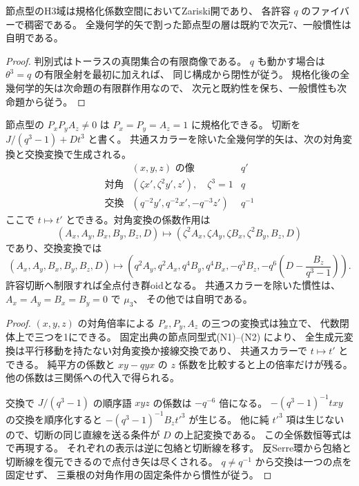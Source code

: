 \begin{corollary}\label{cor:cubic-CY-three-alpha-nodal-E6-open}
節点型のH3域は規格化係数空間においてZariski開であり、
各許容 $q$ のファイバーで稠密である。
全幾何学的矢で割った節点型の層は既約で次元7、一般慣性は自明である。
\end{corollary}
\begin{proof}
判別式はトーラスの真閉集合の有限商像である。
$q$ も動かす場合は $\theta^3=q$ の有限全射を最初に加えれば、
同じ構成から閉性が従う。
規格化後の全幾何学的矢は次命題の有限群作用なので、
次元と既約性を保ち、一般慣性も次命題から従う。
\end{proof}

\begin{proposition}\label{prop:cubic-CY-three-alpha-nodal-arrows}
節点型の $P_xP_yA_z\ne0$ は $P_x=P_y=A_z=1$ に規格化できる。
切断を $J/(q^3-1)+Dt^3$ と書く。
共通スカラーを除いた全幾何学的矢は、次の対角変換と交換変換で生成される。
\[
\begin{array}{c|c|c}
 & (x,y,z)\text{ の像} & q'\\ \hline
 \text{対角} & (\zeta x',\zeta^2y',z'),\quad \zeta^3=1 & q\\
 \text{交換} & (q^{-2}y',q^{-2}x',-q^{-3}z') & q^{-1}
\end{array}
\]
ここで $t\mapsto t'$ とできる。対角変換の係数作用は
\[
 (A_x,A_y,B_x,B_y,B_z,D)
 \longmapsto(\zeta^2 A_x,\zeta A_y,\zeta B_x,\zeta^2 B_y,B_z,D)
\]
であり、交換変換では
\[
 (A_x,A_y,B_x,B_y,B_z,D)
 \longmapsto
 \left(q^2 A_y,q^2 A_x,q^4 B_y,q^4 B_x,-q^3 B_z,
       -q^6\left(D-\frac{B_z}{q^3-1}\right)\right).
\]
許容切断へ制限すれば全点付き群oidとなる。
共通スカラーを除いた慣性は、$A_x=A_y=B_x=B_y=0$ で $\mu_3$、
その他では自明である。
\end{proposition}
\begin{proof}
$(x,y,z)$ の対角倍率による $P_x,P_y,A_z$ の三つの変換式は独立で、
代数閉体上で三つを1にできる。
固定出典の節点同型式(N1)--(N2) \cite{AS4CYpinned}により、
全生成元変換は平行移動を持たない対角変換か接線交換であり、
共通スカラーで $t\mapsto t'$ とできる。
純平方の係数と $xy-qyx$ の $z$ 係数を比較すると上の倍率だけが残る。
他の係数は三関係への代入で得られる。

交換で $J/(q^3-1)$ の順序語 $xyz$ の係数は $-q^{-6}$ 倍になる。
$-(q^3-1)^{-1}txy$ の交換を順序化すると
$-(q^3-1)^{-1}B_z t'^3$ が生じる。
他に純 $t'^3$ 項は生じないので、切断の同じ直線を送る条件が
$D$ の上記変換である。
この全係数恒等式は  で再現する。
それぞれの表示は逆に包絡と切断線を移す。
反Serre環から包絡と切断線を復元できるので点付き矢は尽くされる。
$q\ne q^{-1}$ から交換は一つの点を固定せず、
三乗根の対角作用の固定条件から慣性が従う。
\end{proof}

